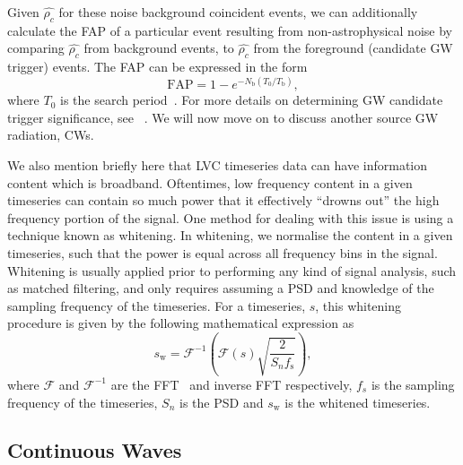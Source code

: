 Given $\hat{\rho_c}$ for these noise background coincident events, we can 
additionally calculate the \ac{FAP} of a particular event resulting from 
non-astrophysical noise by comparing $\hat{\rho_c}$ from 
background events, to $\hat{\rho_c}$ from the foreground 
(candidate \ac{GW} trigger) events. The \ac{FAP} can be 
expressed in the form 
%
\begin{equation}
    \mathrm{FAP} = 1 - e^{-N_{\mathrm{b}}(T_0 / T_{\mathrm{b}})},
\end{equation}
%
where $T_0$ is the search period~.
For more details on determining \ac{GW} candidate trigger significance, see 
~\cite{0264-9381-33-21-215004,2016arXiv160100130C}. We will now 
move on to discuss another source \ac{GW} radiation, \ac{CW}s.

%
%
We also mention briefly here that \ac{LVC} timeseries 
data can have information content which is broadband. Oftentimes, 
low frequency content in a given timeseries can contain so much 
power that it effectively ``drowns out'' the high frequency 
portion of the signal. One method for dealing with this issue is using a 
technique known as whitening. In whitening, we normalise the content 
in a given timeseries, such that the power is equal across all frequency bins 
in the signal. Whitening is usually applied prior to performing any 
kind of signal analysis, such as matched filtering, and only requires 
assuming a \ac{PSD} and knowledge of the sampling frequency of the 
timeseries. For a timeseries, $s$, this whitening procedure is given by the 
following mathematical expression as 
%
\begin{equation}
    s_{\mathrm{w}} = \mathcal{F}^{-1}\left(\mathcal{F}(s) \sqrt{\frac{2}{S_n 
    f_{\mathrm{s}}}}\right), 
\end{equation}
%
where $\mathcal{F}$ and $\mathcal{F}^{-1}$ are the 
\ac{FFT}~\cite{Cooley1965AnAF} and 
inverse \ac{FFT} respectively, $f_s$ is the sampling frequency 
of the timeseries, $S_n$ is the \ac{PSD} and $s_{\mathrm{w}}$ is the 
whitened timeseries. 

\subsection{Continuous Waves}\label{sec:CW_source}

